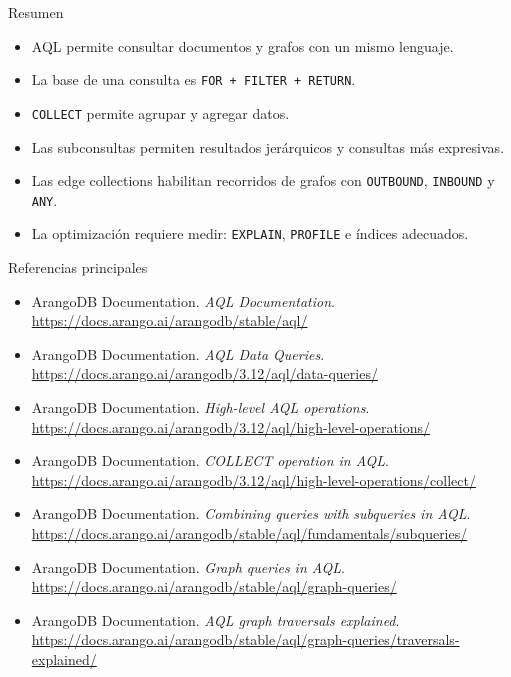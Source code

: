 \documentclass[aspectratio=169,11pt]{beamer}
\begin{document}
\begin{frame}{Resumen}
\begin{itemize}
  \item AQL permite consultar documentos y grafos con un mismo lenguaje.
  \item La base de una consulta es \texttt{FOR + FILTER + RETURN}.
  \item \texttt{COLLECT} permite agrupar y agregar datos.
  \item Las subconsultas permiten resultados jerárquicos y consultas más expresivas.
  \item Las edge collections habilitan recorridos de grafos con \texttt{OUTBOUND}, \texttt{INBOUND} y \texttt{ANY}.
  \item La optimización requiere medir: \texttt{EXPLAIN}, \texttt{PROFILE} e índices adecuados.
\end{itemize}
\end{frame}

\begin{frame}{Referencias principales}
\footnotesize
\begin{itemize}
  \item ArangoDB Documentation. \textit{AQL Documentation}. \url{https://docs.arango.ai/arangodb/stable/aql/}
  \item ArangoDB Documentation. \textit{AQL Data Queries}. \url{https://docs.arango.ai/arangodb/3.12/aql/data-queries/}
  \item ArangoDB Documentation. \textit{High-level AQL operations}. \url{https://docs.arango.ai/arangodb/3.12/aql/high-level-operations/}
  \item ArangoDB Documentation. \textit{COLLECT operation in AQL}. \url{https://docs.arango.ai/arangodb/3.12/aql/high-level-operations/collect/}
  \item ArangoDB Documentation. \textit{Combining queries with subqueries in AQL}. \url{https://docs.arango.ai/arangodb/stable/aql/fundamentals/subqueries/}
  \item ArangoDB Documentation. \textit{Graph queries in AQL}. \url{https://docs.arango.ai/arangodb/stable/aql/graph-queries/}
  \item ArangoDB Documentation. \textit{AQL graph traversals explained}. \url{https://docs.arango.ai/arangodb/stable/aql/graph-queries/traversals-explained/}
\end{itemize}
\end{frame}
\end{document}
